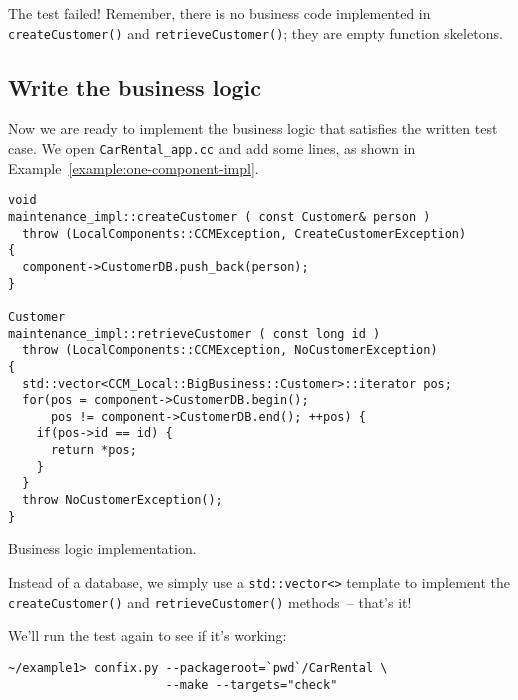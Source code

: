 The test failed!
Remember, there is no business code implemented in {\tt createCustomer()} and 
{\tt retrieveCustomer()}; they are empty function skeletons. 



\subsection{Write the business logic}

Now we are ready to implement the business logic that satisfies the written test
case. We open {\tt CarRental\_app.cc} and add some lines, as shown in
Example~\ref{example:one-component-impl}.

\begin{Example}
\begin{minifbox}
\begin{small}
\begin{verbatim}
void
maintenance_impl::createCustomer ( const Customer& person )
  throw (LocalComponents::CCMException, CreateCustomerException)
{
  component->CustomerDB.push_back(person);
}

Customer
maintenance_impl::retrieveCustomer ( const long id )
  throw (LocalComponents::CCMException, NoCustomerException)
{
  std::vector<CCM_Local::BigBusiness::Customer>::iterator pos;
  for(pos = component->CustomerDB.begin(); 
      pos != component->CustomerDB.end(); ++pos) {
    if(pos->id == id) {
      return *pos;
    }
  }
  throw NoCustomerException();
}
\end{verbatim}
\end{small}
\end{minifbox}
\caption{Business logic implementation.}
\label{example:one-component-impl}
\end{Example}

Instead of a database, we simply use a {\tt std::vector<>} template to implement
the {\tt createCustomer()} and {\tt retrieveCustomer()} methods~-- that's it! 

We'll run the test again to see if it's working:
\begin{small}
\begin{verbatim}
~/example1> confix.py --packageroot=`pwd`/CarRental \
                      --make --targets="check"
\end{verbatim}
\end{small}

